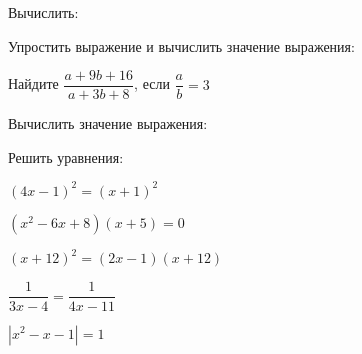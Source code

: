 \begin{listofex}
	\item {}
	\item Вычислить:
	\begin{enumcols}[itemcolumns=3]
		\item {}
		\item {}
		\item {}
	\end{enumcols}
	\item Упростить выражение и вычислить значение выражения:
	\begin{enumcols}[itemcolumns=1]
		\item {}
		\item {}
	\end{enumcols}
	\item Найдите \( \dfrac{a+9b+16}{a+3b+8} \), если \( \dfrac{a}{b}=3 \)
	\item Вычислить значение выражения:
	\begin{enumcols}[itemcolumns=1]
		\item {}
		\item {}
		\item {}
	\end{enumcols}
	\item {}
	\item Решить уравнения:
	\begin{enumcols}[itemcolumns=2]
		\item \( (4x-1)^2=(x+1)^2 \)
		\item \( (x^2-6x+8)(x+5)=0 \)
		\item \( (x+12)^2=(2x-1)(x+12) \)
		\item \( \dfrac{1}{3x-4}=\dfrac{1}{4x-11} \)
		\item \( |x^2-x-1|=1 \)
	\end{enumcols}
\end{listofex}